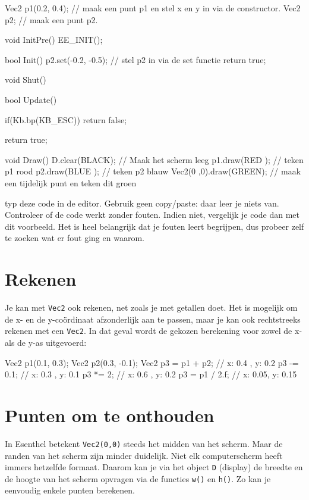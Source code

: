 \begin{code}
Vec2 p1(0.2, 0.4); // maak een punt p1 en stel x en y in via de constructor.
Vec2 p2;           // maak een punt p2.

void InitPre()
{
   EE_INIT();
}

bool Init()
{
   p2.set(-0.2, -0.5); // stel p2 in via de set functie
   return true;
}

void Shut() {}

bool Update()
{
   if(Kb.bp(KB_ESC)) return false;
   
   return true;
}

void Draw()
{
   D.clear(BLACK); // Maak het scherm leeg
   p1.draw(RED  ); // teken p1 rood  
   p2.draw(BLUE ); // teken p2 blauw
   Vec2(0 ,0).draw(GREEN); // maak een tijdelijk punt en teken dit groen
}

\end{code}

\begin{exercise}
typ deze code in de editor. Gebruik geen copy/paste: daar leer je niets van. Controleer of de code werkt zonder fouten. Indien niet, vergelijk je code dan met dit voorbeeld. Het is heel belangrijk dat je fouten leert begrijpen, dus probeer zelf te zoeken wat er fout ging en waarom.
\end{exercise}

\section{Rekenen}
Je kan met \texttt{Vec2} ook rekenen, net zoals je met getallen doet. Het is mogelijk om de x- en de y-co\"ordinaat afzonderlijk aan te passen, maar je kan ook rechtstreeks rekenen met een \texttt{Vec2}. In dat geval wordt de gekozen berekening voor zowel de x- als de y-as uitgevoerd:

\begin{code}
Vec2 p1(0.1,  0.3);
Vec2 p2(0.3, -0.1);
Vec2 p3 = p1 + p2;  // x: 0.4 , y: 0.2
p3 -= 0.1;          // x: 0.3 , y: 0.1
p3 *= 2;            // x: 0.6 , y: 0.2
p3 = p1 / 2.f;      // x: 0.05, y: 0.15 
\end{code}

\section{Punten om te onthouden}
In Esenthel betekent \texttt{Vec2(0,0)} steeds het midden van het scherm. Maar de randen van het scherm zijn minder duidelijk. Niet elk computerscherm heeft immers hetzelfde formaat. Daarom kan je via het object \texttt{D} (display) de breedte en de hoogte van het scherm opvragen via de functies \texttt{w()} en \texttt{h()}. Zo kan je eenvoudig enkele punten berekenen.


